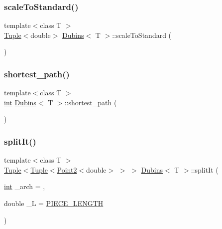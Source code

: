 \subsubsection{\texorpdfstring{scaleToStandard()}{scaleToStandard()}}
{\footnotesize\ttfamily template$<$class T $>$ \\
\mbox{\hyperlink{class_tuple}{Tuple}}$<$double$>$ \mbox{\hyperlink{class_dubins}{Dubins}}$<$ T $>$\+::scale\+To\+Standard (\begin{DoxyParamCaption}{ }\end{DoxyParamCaption})\hspace{0.3cm}{\ttfamily [inline]}}

\mbox{\label{class_dubins_a52681fe06e50899b5296204a312233ce}} 
\subsubsection{\texorpdfstring{shortest\_path()}{shortest\_path()}}
{\footnotesize\ttfamily template$<$class T $>$ \\
\mbox{\hyperlink{draw_8hh_aa620a13339ac3a1177c86edc549fda9b}{int}} \mbox{\hyperlink{class_dubins}{Dubins}}$<$ T $>$\+::shortest\+\_\+path (\begin{DoxyParamCaption}{ }\end{DoxyParamCaption})\hspace{0.3cm}{\ttfamily [inline]}}

\mbox{\label{class_dubins_a68d6703215b12b2933346efd77563575}} 
\subsubsection{\texorpdfstring{splitIt()}{splitIt()}}
{\footnotesize\ttfamily template$<$class T $>$ \\
\mbox{\hyperlink{class_tuple}{Tuple}}$<$\mbox{\hyperlink{class_tuple}{Tuple}}$<$\mbox{\hyperlink{class_point2}{Point2}}$<$double$>$ $>$ $>$ \mbox{\hyperlink{class_dubins}{Dubins}}$<$ T $>$\+::split\+It (\begin{DoxyParamCaption}\item[{\mbox{\hyperlink{draw_8hh_aa620a13339ac3a1177c86edc549fda9b}{int}}}]{\+\_\+arch = {},  }\item[{double}]{\+\_\+L = {\ttfamily \mbox{\hyperlink{dubins_8hh_a5b2500ca93a5100f73dc442d3cfea7d4}{P\+I\+E\+C\+E\+\_\+\+L\+E\+N\+G\+TH}}} }\end{DoxyParamCaption})\hspace{0.3cm}{\ttfamily [inline]}}

